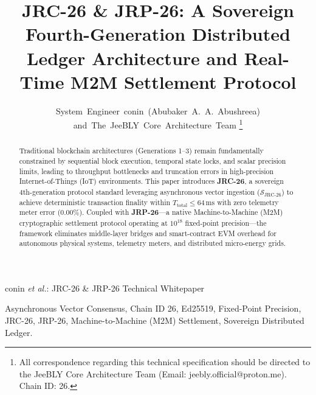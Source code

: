 \documentclass[10pt,journal,compsoc]{IEEEtran}
\begin{document}
\title{JRC-26 \& JRP-26: A Sovereign Fourth-Generation Distributed Ledger Architecture and Real-Time M2M Settlement Protocol}

\author{System~Engineer~conin~(Abubaker~A.~A.~Abushreea) and~The~JeeBLY~Core~Architecture~Team
\thanks{All correspondence regarding this technical specification should be directed to the JeeBLY Core Architecture Team (Email: jeebly.official@proton.me). Chain ID: 26.}}

%
{conin \MakeLowercase{\textit{et al.}}: JRC-26 \& JRP-26 Technical Whitepaper}

\maketitle

\begin{abstract}
Traditional blockchain architectures (Generations 1--3) remain fundamentally constrained by sequential block execution, temporal state locks, and scalar precision limits, leading to throughput bottlenecks and truncation errors in high-precision Internet-of-Things (IoT) environments. This paper introduces \textbf{JRC-26}, a sovereign 4th-generation protocol standard leveraging asynchronous vector ingestion ($\mathcal{S}_{\text{JRC-26}}$) to achieve deterministic transaction finality within $T_{\text{total}} \le 64\,\text{ms}$ with zero telemetry meter error ($0.00\%$). Coupled with \textbf{JRP-26}---a native Machine-to-Machine (M2M) cryptographic settlement protocol operating at $10^{18}$ fixed-point precision---the framework eliminates middle-layer bridges and smart-contract EVM overhead for autonomous physical systems, telemetry meters, and distributed micro-energy grids.
\end{abstract}

\begin{IEEEkeywords}
Asynchronous Vector Consensus, Chain ID 26, Ed25519, Fixed-Point Precision, JRC-26, JRP-26, Machine-to-Machine (M2M) Settlement, Sovereign Distributed Ledger.
\end{IEEEkeywords}
\end{document}
